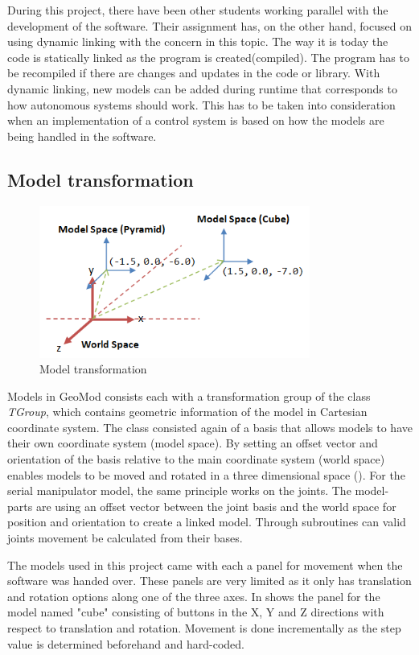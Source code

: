 During this project, there have been other students working parallel with the development of the software. Their assignment has, on the other hand, focused on using dynamic linking with the concern in this topic. The way it is today the code is statically linked as the program is created(compiled). The program has to be recompiled if there are changes and updates in the code or library. With dynamic linking, new models can be added during runtime that corresponds to how autonomous systems should work. This has to be taken into consideration when an implementation of a control system is based on how the models are being handled in the software.


\subsection{Model transformation}

\begin{figure}[ht]
    \centering
    \includegraphics[height=5cm]{images/ModelSpace.png}
    \caption[Model transformation \cite{modelspace}]{Model transformation \cite{modelspace}}
    \label{fig:modelspace}
\end{figure}

Models in GeoMod consists each with a transformation group of the class \textit{TGroup}, which contains geometric information of the model in Cartesian coordinate system. The class consisted again of a basis that allows models to have their own coordinate system (model space). By setting an offset vector and orientation of the basis relative to the main coordinate system (world space) enables models to be moved and rotated in a three dimensional space (). For the serial manipulator model, the same principle works on the joints. The model-parts are using an offset vector between the joint basis and the world space for position and orientation to create a linked model. Through subroutines can valid joints movement be calculated from their bases.

The models used in this project came with each a panel for movement when the software was handed over. These panels are very limited as it only has translation and rotation options along one of the three axes. In  shows the panel for the model named "cube" consisting of buttons in the X, Y and Z directions with respect to translation and rotation. Movement is done incrementally as the step value is determined beforehand and hard-coded. 

